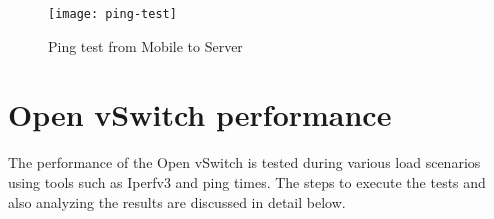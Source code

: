 \begin{figure}
	\centering
	\texttt{[image: ping-test]}
	\caption {Ping test from Mobile to Server}
	\label{fig:ping_test}
	\vspace{-10pt}
\end{figure}
%	
\section{Open vSwitch performance}
The performance of the Open vSwitch is tested during various load scenarios using tools such as Iperfv3 and ping times. The steps to execute the tests and also analyzing the results are discussed in detail below.

